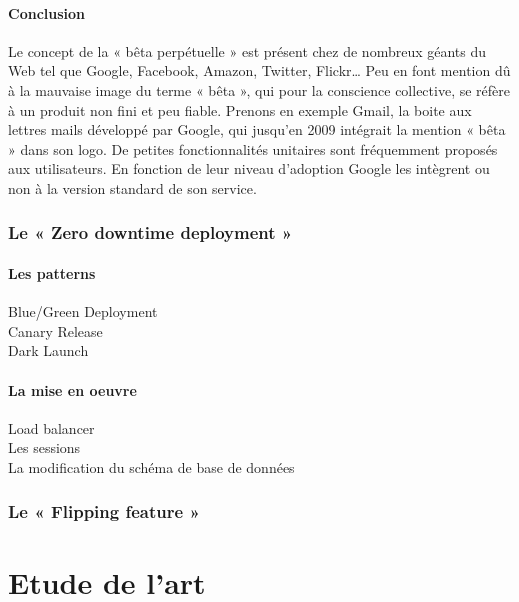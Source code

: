 \documentclass{report}
\begin{document}
        \subsubsection{Conclusion}
        Le concept de la « bêta perpétuelle » est présent chez de nombreux géants du Web tel que Google, Facebook, Amazon, Twitter, Flickr… Peu en font mention dû à la mauvaise image du terme « bêta », qui pour la conscience collective, se réfère à un produit non fini et peu fiable. Prenons en exemple Gmail, la boite aux lettres mails développé par Google, qui jusqu’en 2009 intégrait la mention « bêta » dans son logo. De petites fonctionnalités unitaires sont fréquemment proposés aux utilisateurs. En fonction de leur niveau d’adoption Google les intègrent ou non à la version standard de son service.

      \subsection{Le « Zero downtime deployment »}

          \subsubsection{Les patterns}
          Blue/Green Deployment\\

          Canary Release\\

          Dark Launch\\

          \subsubsection{La mise en oeuvre}
          Load balancer\\

          Les sessions\\

          La modification du schéma de base de données\\

        \subsection{Le « Flipping feature »}

    \chapter{Etude de l'art}
\end{document}
